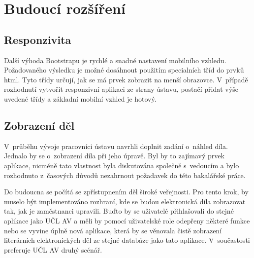 
\chapter{Budoucí rozšíření}
        
    \section{Responzivita}
        Další výhoda Bootstrapu je rychlé a snadné nastavení mobilního vzhledu. Požadovaného výsledku je možné dosáhnout použitím specialních tříd do prvků html. Tyto třídy určují, jak se má prvek zobrazit na menší obrazovce. V~případě rozhodnutí vytvořit responzivní aplikaci ze strany ústavu, postačí přidat výše uvedené třídy a základní mobilní vzhled je hotový.
        
        
    \section{Zobrazení děl}
        V~průběhu vývoje pracovníci ústavu navrhli doplnit zadání o~náhled díla. Jednalo by se o~zobrazení díla při jeho úpravě. Byl by to zajímavý prvek aplikace, nicméně tato vlastnost byla diskutována společně s~vedoucím a bylo rozhodnuto z~časových důvodů nezahrnout požadavek do této bakalářské práce.
        
        Do budoucna se počítá se zpřístupnením děl široké veřejnosti. Pro tento krok, by muselo být implementováno rozhraní, kde se budou elektronická díla zobrazovat tak, jak je zaměstnanci upravili. Buďto by se uživatelé přihlašovali do stejné aplikace jako UČL AV a měli by pomocí uživatelské  role odepřeny některé funkce nebo se vyvine úplně nová aplikace, která by se věnovala čistě zobrazení literárních elektronických děl ze stejné databáze jako tato aplikace. V~součastosti preferuje UČL AV druhý scénář.
        
        
